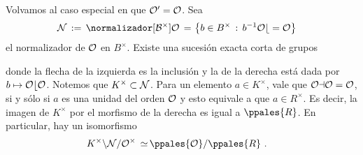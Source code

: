 Volvamos al caso especial en que $\cal{O}'=\cal{O}$. Sea
\begin{align*}
 \cal{N}\,:=\,\normalizador[B^{\times}]{\cal{O}} \,=\, &
	\left\lbrace b\in B^{\times}\,:\,b^{-1}\cal{O}b=\cal{O}
	\right\rbrace
\end{align*}
%
el normalizador de $\cal{O}$ en $B^{\times}$. %
Existe una sucesi\'{o}n exacta corta de grupos
\begin{center}
\quad\text{,}
\end{center}
%
donde %
la flecha de la izquierda es la inclusi\'{o}n y la de la derecha est\'{a}
dada por $b\mapsto\cal{O}b\cal{O}$. Notemos que
$K^{\times}\subset\cal{N}$. Para un elemento
$a\in K^{\times}$, vale que $\cal{O}a\cal{O}=\cal{O}$, si y s\'{o}lo si
$a$ es una unidad del orden $\cal{O}$ y esto equivale a que $a\in R^{\times}$.
Es decir, la imagen de $K^{\times}$ por el morfismo de la derecha es igual
a $\ppales{R}$. En particular, hay un isomorfismo
\begin{align*}
	K^{\times}\backslash \cal{N}/\cal{O}^{\times}
	\,\simeq\, & \ppales{\cal{O}}/\ppales{R}
	\text{ .}
\end{align*}
%
